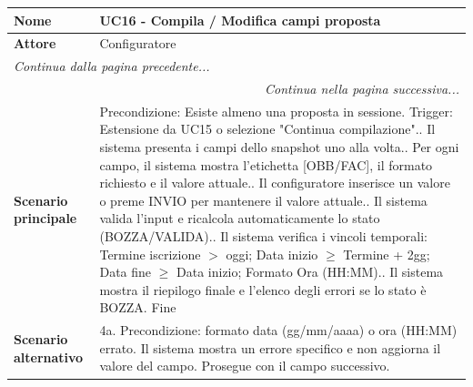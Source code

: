 \documentclass[12pt, a4paper, oneside]{report}
\begin{document}
\renewcommand{\arraystretch}{1.4} 

\begin{tabularx}{\textwidth}{|l|X|}
    \hline
    \textbf{Nome}               & \textbf{UC16 - Compila / Modifica campi proposta} \\ \hline
    \textbf{Attore}             & Configuratore \\ \hline
    \endfirsthead 

    \hline
    \multicolumn{2}{|l|}{\textit{Continua dalla pagina precedente...}} \\ \hline
    \endhead 

    \hline
    \multicolumn{2}{|r|}{\textit{Continua nella pagina successiva...}} \\ \hline
    \endfoot 

    \hline
    \endlastfoot

    \textbf{Scenario principale} & 
    Precondizione: Esiste almeno una proposta in sessione.\newline
    Trigger: Estensione da UC15 o selezione "Continua compilazione".\newline
    1. Il sistema presenta i campi dello snapshot uno alla volta.\newline
    2. Per ogni campo, il sistema mostra l'etichetta [OBB/FAC], il formato richiesto e il valore attuale.\newline
    3. Il configuratore inserisce un valore o preme INVIO per mantenere il valore attuale.\newline
    4. Il sistema valida l'input e ricalcola automaticamente lo stato (BOZZA/VALIDA).\newline
    5. Il sistema verifica i vincoli temporali: Termine iscrizione $>$ oggi; Data inizio $\ge$ Termine + 2gg; Data fine $\ge$ Data inizio; Formato Ora (HH:MM).\newline
    6. Il sistema mostra il riepilogo finale e l'elenco degli errori se lo stato è BOZZA.\newline
    Fine \\ \hline
    
    \textbf{Scenario alternativo} & 
    4a. Precondizione: formato data (gg/mm/aaaa) o ora (HH:MM) errato.\newline
    Il sistema mostra un errore specifico e non aggiorna il valore del campo. Prosegue con il campo successivo. \\ \hline
\end{tabularx}

\renewcommand{\arraystretch}{1.4} 
\end{document}
